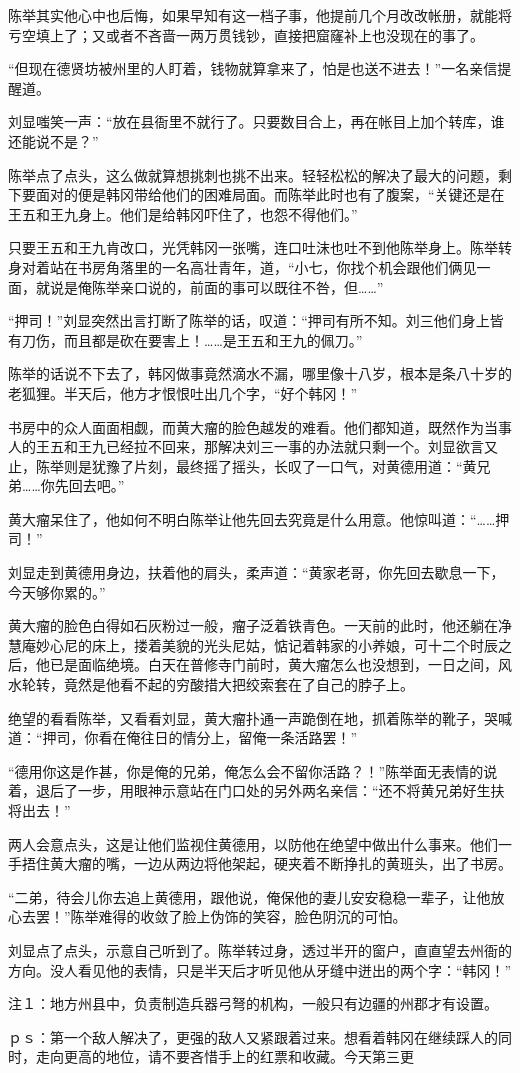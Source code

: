 陈举其实他心中也后悔，如果早知有这一档子事，他提前几个月改改帐册，就能将亏空填上了；又或者不吝啬一两万贯钱钞，直接把窟窿补上也没现在的事了。

“但现在德贤坊被州里的人盯着，钱物就算拿来了，怕是也送不进去！”一名亲信提醒道。

刘显嗤笑一声：“放在县衙里不就行了。只要数目合上，再在帐目上加个转库，谁还能说不是？”

陈举点了点头，这么做就算想挑刺也挑不出来。轻轻松松的解决了最大的问题，剩下要面对的便是韩冈带给他们的困难局面。而陈举此时也有了腹案，“关键还是在王五和王九身上。他们是给韩冈吓住了，也怨不得他们。”

只要王五和王九肯改口，光凭韩冈一张嘴，连口吐沫也吐不到他陈举身上。陈举转身对着站在书房角落里的一名高壮青年，道，“小七，你找个机会跟他们俩见一面，就说是俺陈举亲口说的，前面的事可以既往不咎，但……”

“押司！”刘显突然出言打断了陈举的话，叹道：“押司有所不知。刘三他们身上皆有刀伤，而且都是砍在要害上！……是王五和王九的佩刀。”

陈举的话说不下去了，韩冈做事竟然滴水不漏，哪里像十八岁，根本是条八十岁的老狐狸。半天后，他方才恨恨吐出几个字，“好个韩冈！”

书房中的众人面面相觑，而黄大瘤的脸色越发的难看。他们都知道，既然作为当事人的王五和王九已经拉不回来，那解决刘三一事的办法就只剩一个。刘显欲言又止，陈举则是犹豫了片刻，最终摇了摇头，长叹了一口气，对黄德用道：“黄兄弟……你先回去吧。”

黄大瘤呆住了，他如何不明白陈举让他先回去究竟是什么用意。他惊叫道：“……押司！”

刘显走到黄德用身边，扶着他的肩头，柔声道：“黄家老哥，你先回去歇息一下，今天够你累的。”

黄大瘤的脸色白得如石灰粉过一般，瘤子泛着铁青色。一天前的此时，他还躺在净慧庵妙心尼的床上，搂着美貌的光头尼姑，惦记着韩家的小养娘，可十二个时辰之后，他已是面临绝境。白天在普修寺门前时，黄大瘤怎么也没想到，一日之间，风水轮转，竟然是他看不起的穷酸措大把绞索套在了自己的脖子上。

绝望的看看陈举，又看看刘显，黄大瘤扑通一声跪倒在地，抓着陈举的靴子，哭喊道：“押司，你看在俺往日的情分上，留俺一条活路罢！”

“德用你这是作甚，你是俺的兄弟，俺怎么会不留你活路？！”陈举面无表情的说着，退后了一步，用眼神示意站在门口处的另外两名亲信：“还不将黄兄弟好生扶将出去！”

两人会意点头，这是让他们监视住黄德用，以防他在绝望中做出什么事来。他们一手捂住黄大瘤的嘴，一边从两边将他架起，硬夹着不断挣扎的黄班头，出了书房。

“二弟，待会儿你去追上黄德用，跟他说，俺保他的妻儿安安稳稳一辈子，让他放心去罢！”陈举难得的收敛了脸上伪饰的笑容，脸色阴沉的可怕。

刘显点了点头，示意自己听到了。陈举转过身，透过半开的窗户，直直望去州衙的方向。没人看见他的表情，只是半天后才听见他从牙缝中迸出的两个字：“韩冈！”

注１：地方州县中，负责制造兵器弓弩的机构，一般只有边疆的州郡才有设置。

ｐｓ：第一个敌人解决了，更强的敌人又紧跟着过来。想看着韩冈在继续踩人的同时，走向更高的地位，请不要吝惜手上的红票和收藏。今天第三更

